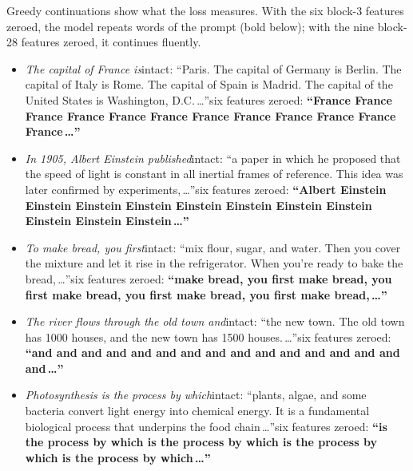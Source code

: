 \documentclass[11pt]{article}
\begin{document}
Greedy continuations show what the loss measures. With the six block-3 features zeroed, the model repeats words of the prompt (bold below); with the nine block-28 features zeroed, it continues fluently.

\begin{itemize}
\item \textit{The capital of France is}\newline intact: ``Paris. The capital of Germany is Berlin. The capital of Italy is Rome. The capital of Spain is Madrid. The capital of the United States is Washington, D.C.\,\ldots''\newline six features zeroed: \textbf{``France France France France France France France France France France France France\,\ldots''}
\item \textit{In 1905, Albert Einstein published}\newline intact: ``a paper in which he proposed that the speed of light is constant in all inertial frames of reference. This idea was later confirmed by experiments,\,\ldots''\newline six features zeroed: \textbf{``Albert Einstein Einstein Einstein Einstein Einstein Einstein Einstein Einstein Einstein Einstein Einstein\,\ldots''}
\item \textit{To make bread, you first}\newline intact: ``mix flour, sugar, and water. Then you cover the mixture and let it rise in the refrigerator. When you're ready to bake the bread,\,\ldots''\newline six features zeroed: \textbf{``make bread, you first make bread, you first make bread, you first make bread, you first make bread,\,\ldots''}
\item \textit{The river flows through the old town and}\newline intact: ``the new town. The old town has 1000 houses, and the new town has 1500 houses.\,\ldots''\newline six features zeroed: \textbf{``and and and and and and and and and and and and and and and and\,\ldots''}
\item \textit{Photosynthesis is the process by which}\newline intact: ``plants, algae, and some bacteria convert light energy into chemical energy. It is a fundamental biological process that underpins the food chain\,\ldots''\newline six features zeroed: \textbf{``is the process by which is the process by which is the process by which is the process by which\,\ldots''}
\end{itemize}
\end{document}
